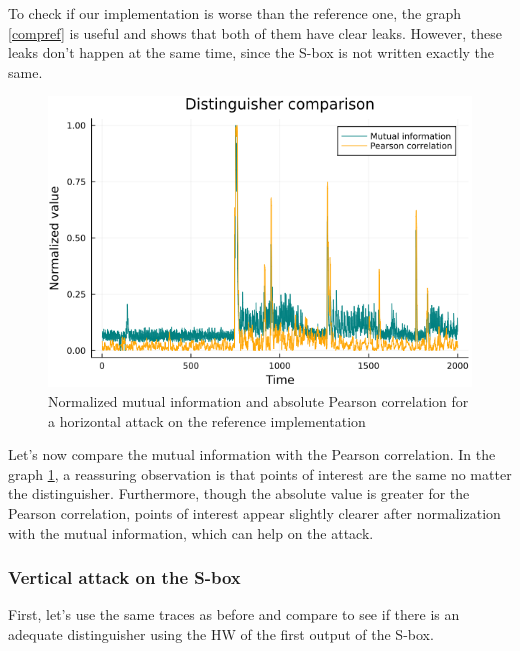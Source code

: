 \documentclass[11pt,technote]{IEEEtran}
\begin{document}
		To check if our implementation is worse than the reference one, the graph \ref{compref} is useful and shows that both of them have clear leaks. However, these leaks don't happen at the same time, since the S-box is not written exactly the same. 
		
		\begin{figure}[H]
			\centering
			\includegraphics[scale=0.4]{img_files/corr_vs_MI_hHW}
			\caption{Normalized mutual information and absolute Pearson correlation for a horizontal attack on the reference implementation}
			\label{corvsMI}
		\end{figure}
		
		Let's now compare the mutual information with the Pearson correlation. In the graph \ref{corvsMI}, a reassuring observation is that points of interest are the same no matter the distinguisher. Furthermore, though the absolute value is greater for the Pearson correlation, points of interest appear slightly clearer after normalization with the mutual information, which can help on the attack.
		
		\subsubsection{Vertical attack on the S-box}
		First, let's use the same traces as before and compare to see if there is an adequate distinguisher using the HW of the first output of the S-box.
		
\end{document}
